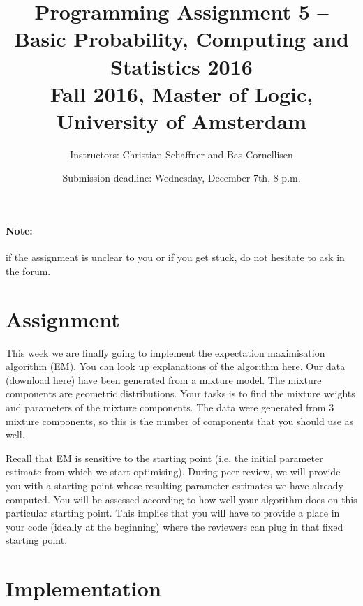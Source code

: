 \documentclass[11pt, leqno, a4paper]{article}
\title{Programming Assignment 5 -- Basic Probability, Computing and Statistics 2016 \\[2mm]
\large{Fall 2016, Master of Logic, University of Amsterdam}}
\author{Instructors: Christian Schaffner and Bas Cornellisen}
\date{Submission deadline: Wednesday, December 7th, 8 p.m.}
\begin{document}
\maketitle

\paragraph{Note:} if the assignment is unclear to you or if you get
stuck, do not hesitate to ask in the
\href{https://www.moodle.ch/lms/mod/forum/view.php?id=1721}{forum}.

\section{Assignment}

This week we are finally going to implement the expectation maximisation algorithm (EM). You can look up explanations of the algorithm 
\href{https://github.com/BasicProbability/LectureNotes/blob/master/chapter6/chapter6.pdf}{here}. Our data (download \href{https://github.com/BasicProbability/BasicProbability.github.io/raw/master/Homework/Programming/2016-17/Assignment5/geometric_data.txt}{here}) have been generated from a mixture model. The mixture components are geometric distributions. Your tasks is to find
the mixture weights and parameters of the mixture components. The data were generated from 3 mixture components, so this is the number of components
that you should use as well.

Recall that EM is sensitive to the starting point (i.e. the initial parameter estimate from which we start optimising). During peer review, we will
provide you with a starting point whose resulting parameter estimates we have already computed. You will be assessed according to how well your
algorithm does on this particular starting point. This implies that you will have to provide a place in your code (ideally at the beginning) where
the reviewers can plug in that fixed starting point.

\section{Implementation}

\end{document}
